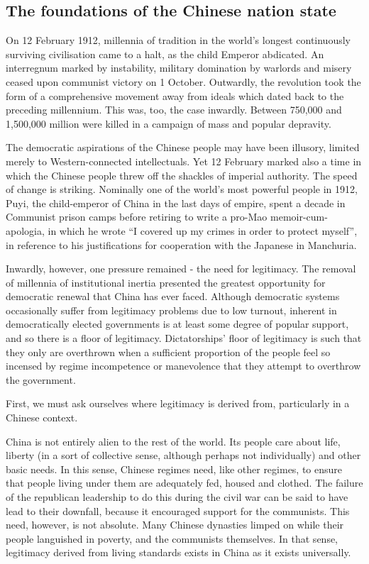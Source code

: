 \documentclass[10pt,a4paper,twocolumn]{article}
\begin{document}
\subsection{The foundations of the Chinese nation state}

On 12 February 1912, millennia of tradition in the world’s longest continuously surviving civilisation came to a halt, as the child Emperor abdicated. An interregnum marked by instability, military domination by warlords and misery ceased upon communist victory on 1 October. Outwardly, the revolution took the form of a comprehensive movement away from ideals which dated back to the preceding millennium. This was, too, the case inwardly. Between 750,000 and 1,500,000 million were killed in a campaign of mass and popular depravity\cite{puyi_autobio}.

The democratic aspirations of the Chinese people may have been illusory, limited merely to Western-connected intellectuals. Yet 12 February marked also a time in which the Chinese people threw off the shackles of imperial authority. The speed of change is striking. Nominally one of the world’s most powerful people in 1912, Puyi, the child-emperor of China in the last days of empire, spent a decade in Communist prison camps before retiring to write a pro-Mao memoir-cum-apologia, in which he wrote ``I covered up my crimes in order to protect myself”\cite{cultural_revolution}, in reference to his justifications for cooperation with the Japanese in Manchuria.

Inwardly, however, one pressure remained - the need for legitimacy. The removal of millennia of institutional inertia presented the greatest opportunity for democratic renewal that China has ever faced. Although democratic systems occasionally suffer from legitimacy problems due to low turnout, inherent in democratically elected governments is at least some degree of popular support, and so there is a floor of legitimacy. Dictatorships' floor of legitimacy is such that they only are overthrown when a sufficient proportion of the people feel so incensed by regime incompetence or manevolence that they attempt to overthrow the government.

First, we must ask ourselves where legitimacy is derived from, particularly in a Chinese context.

China is not entirely alien to the rest of the world. Its people care about life, liberty (in a sort of collective sense, although perhaps not individually) and other basic needs. In this sense, Chinese regimes need, like other regimes, to ensure that people living under them are adequately fed, housed and clothed. The failure of the republican leadership to do this during the civil war can be said to have lead to their downfall, because it encouraged support for the communists. This need, however, is not absolute. Many Chinese dynasties limped on while their people languished in poverty, and the communists themselves. In that sense, legitimacy derived from living standards exists in China as it exists universally.
\end{document}

